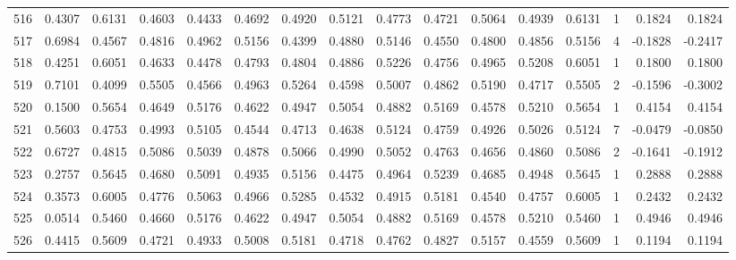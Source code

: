 \begin{tabular}{lrrrrrrrrrrrrrrr}
516 &      0.4307 &  0.6131 &  0.4603 &  0.4433 &  0.4692 &  0.4920 &  0.5121 &  0.4773 &  0.4721 &  0.5064 &   0.4939 &     0.6131 &      1 &                    0.1824 &                     0.1824 \\
517 &      0.6984 &  0.4567 &  0.4816 &  0.4962 &  0.5156 &  0.4399 &  0.4880 &  0.5146 &  0.4550 &  0.4800 &   0.4856 &     0.5156 &      4 &                   -0.1828 &                    -0.2417 \\
518 &      0.4251 &  0.6051 &  0.4633 &  0.4478 &  0.4793 &  0.4804 &  0.4886 &  0.5226 &  0.4756 &  0.4965 &   0.5208 &     0.6051 &      1 &                    0.1800 &                     0.1800 \\
519 &      0.7101 &  0.4099 &  0.5505 &  0.4566 &  0.4963 &  0.5264 &  0.4598 &  0.5007 &  0.4862 &  0.5190 &   0.4717 &     0.5505 &      2 &                   -0.1596 &                    -0.3002 \\
520 &      0.1500 &  0.5654 &  0.4649 &  0.5176 &  0.4622 &  0.4947 &  0.5054 &  0.4882 &  0.5169 &  0.4578 &   0.5210 &     0.5654 &      1 &                    0.4154 &                     0.4154 \\
521 &      0.5603 &  0.4753 &  0.4993 &  0.5105 &  0.4544 &  0.4713 &  0.4638 &  0.5124 &  0.4759 &  0.4926 &   0.5026 &     0.5124 &      7 &                   -0.0479 &                    -0.0850 \\
522 &      0.6727 &  0.4815 &  0.5086 &  0.5039 &  0.4878 &  0.5066 &  0.4990 &  0.5052 &  0.4763 &  0.4656 &   0.4860 &     0.5086 &      2 &                   -0.1641 &                    -0.1912 \\
523 &      0.2757 &  0.5645 &  0.4680 &  0.5091 &  0.4935 &  0.5156 &  0.4475 &  0.4964 &  0.5239 &  0.4685 &   0.4948 &     0.5645 &      1 &                    0.2888 &                     0.2888 \\
524 &      0.3573 &  0.6005 &  0.4776 &  0.5063 &  0.4966 &  0.5285 &  0.4532 &  0.4915 &  0.5181 &  0.4540 &   0.4757 &     0.6005 &      1 &                    0.2432 &                     0.2432 \\
525 &      0.0514 &  0.5460 &  0.4660 &  0.5176 &  0.4622 &  0.4947 &  0.5054 &  0.4882 &  0.5169 &  0.4578 &   0.5210 &     0.5460 &      1 &                    0.4946 &                     0.4946 \\
526 &      0.4415 &  0.5609 &  0.4721 &  0.4933 &  0.5008 &  0.5181 &  0.4718 &  0.4762 &  0.4827 &  0.5157 &   0.4559 &     0.5609 &      1 &                    0.1194 &                     0.1194 \\

\end{tabular}
